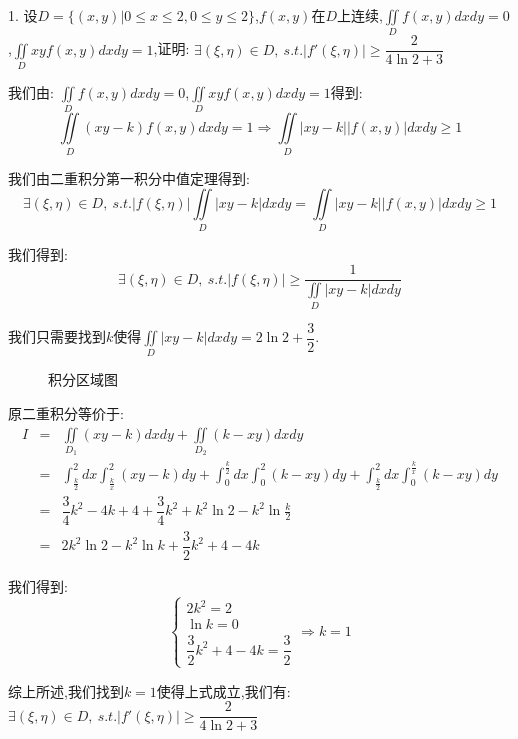 1. 设$D=\{(x,y)|0\leq x\leq 2,0\leq y\leq 2\}$,$f(x,y)$在$D$上连续,$\iint\limits_{D}f(x,y)dxdy=0$,$\iint\limits_{D}xyf(x,y)dxdy=1$,证明: $\exists (\xi,\eta)\in D,\ s.t. |f'(\xi,\eta)|\geq \dfrac{2}{4\ln 2+3}$
\begin{solution}
	
	我们由: $\iint\limits_{D}f(x,y)dxdy=0$,$\iint\limits_{D}xyf(x,y)dxdy=1$得到: 
	$$\iint\limits_{D}(xy-k)f(x,y)dxdy=1\Rightarrow \iint\limits_{D}|xy-k||f(x,y)|dxdy\geq 1$$
	
	我们由二重积分第一积分中值定理得到: 
	$$\exists (\xi,\eta)\in D, \ s.t. |f(\xi,\eta)|\iint\limits_{D}|xy-k|dxdy=\iint\limits_{D}|xy-k||f(x,y)|dxdy\geq 1$$
	
	我们得到: 
	$$\exists (\xi,\eta)\in D, \ s.t. |f(\xi,\eta)|\geq \dfrac{1}{\iint\limits_{D}|xy-k|dxdy}$$
	
	我们只需要找到$k$使得$\iint\limits_{D}|xy-k|dxdy=2\ln2+\dfrac{3}{2}$.
	\begin{figure}[htbp]
		\centering
		\caption{积分区域图}
	\end{figure} 
	
	原二重积分等价于: 
	\begin{eqnarray*}
		I&=&\iint\limits_{D_{1}}(xy-k)dxdy+\iint\limits_{D_{2}}(k-xy)dxdy\\
		&=&\int_{\frac{k}{2}}^{2}dx\int_{\frac{k}{x}}^{2}(xy-k)dy+\int_{0}^{\frac{k}{2}}dx\int_{0}^{2}(k-xy)dy+\int_{\frac{k}{2}}^{2}dx\int_{0}^{\frac{k}{x}}(k-xy)dy\\
		&=&\dfrac{3}{4}k^2-4k+4+\dfrac{3}{4}k^2+k^2\ln 2-k^2\ln \frac{k}{2}\\
		&=&2k^2\ln 2-k^2\ln k+\dfrac{3}{2}k^2+4-4k
	\end{eqnarray*}
	
	我们得到: 
	$$\left\lbrace
	\begin{array}{l}
		2k^2=2\\
		\ln k=0\\
		\dfrac{3}{2}k^2+4-4k=\dfrac{3}{2}
	\end{array}
	\right. \Rightarrow k=1$$
	
	综上所述,我们找到$k=1$使得上式成立,我们有: $\exists (\xi,\eta)\in D,\ s.t. |f'(\xi,\eta)|\geq \dfrac{2}{4\ln 2+3}$
\end{solution}

